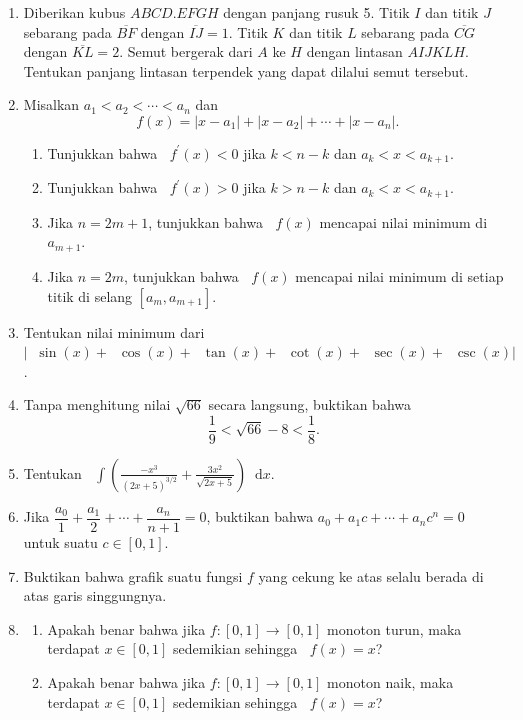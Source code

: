 \documentclass[12pt]{article}
\newcommand*\diff{\mathop{}\!\mathrm{d}}
\newcommand*\func[2]{\mathop{}\!{#1}{\left({#2}\right)}}
\newcommand*\ds[1]{\mathop{}\!\displaystyle{{#1}}}
\begin{document}
\begin{enumerate}[leftmargin=*]
		\item Diberikan kubus $ ABCD.EFGH $ dengan panjang rusuk 5. Titik $ I $ dan titik $ J $ sebarang pada $ \overline{BF} $ dengan $ \overline{IJ} = 1 $. Titik $ K $ dan titik $ L $ sebarang pada $ \overline{CG} $ dengan $ \overline{KL} = 2 $. Semut bergerak dari $ A $ ke $ H $ dengan lintasan $ AIJKLH $. Tentukan panjang lintasan terpendek yang dapat dilalui semut tersebut.
		\item Misalkan $ a_{1} < a_{2} < \cdots < a_{n} $ dan
		\[ \func{f}{x} = \left|x - a_{1}\right| + \left|x - a_{2}\right| + \cdots + \left|x - a_{n}\right|. \]
		\begin{enumerate}
			\item Tunjukkan bahwa $ \func{f^{\prime}}{x} < 0 $ jika $ k < n - k $ dan $ a_{k} < x < a_{k + 1} $.
			\item Tunjukkan bahwa $ \func{f^{\prime}}{x} > 0 $ jika $ k > n - k $ dan $ a_{k} < x < a_{k + 1} $.
			\item Jika $ n = 2m + 1 $, tunjukkan bahwa $ \func{f}{x} $ mencapai nilai minimum di $ a_{m + 1} $.
			\item Jika $ n = 2m $, tunjukkan bahwa $ \func{f}{x} $ mencapai nilai minimum di setiap titik di selang $ \left[a_{m}, a_{m + 1}\right] $.
		\end{enumerate}
		\item Tentukan nilai minimum dari $ \left|\func{\sin}{x} + \func{\cos}{x} + \func{\tan}{x} + \func{\cot}{x} + \func{\sec}{x} + \func{\csc}{x}\right| $.
		\item Tanpa menghitung nilai $ \sqrt{66} $ secara langsung, buktikan bahwa
		\[ \frac{1}{9} < \sqrt{66} - 8 < \frac{1}{8}. \]
		\item Tentukan $ \ds{\int{\left(\frac{-x^{3}}{\left(2x + 5\right)^{3/2}} + \frac{3x^{2}}{\sqrt{2x + 5}}\right) \diff{x}}} $.
		\item Jika $ \dfrac{a_{0}}{1} + \dfrac{a_{1}}{2} + \cdots + \dfrac{a_{n}}{n + 1} = 0 $, buktikan bahwa $ a_{0} + a_{1}c + \cdots + a_{n}c^{n} = 0 $ untuk suatu $ c \in \left[0, 1\right] $.
		\item Buktikan bahwa grafik suatu fungsi $ f $ yang cekung ke atas selalu berada di atas garis singgungnya.
		\item
		\begin{enumerate}
			\item Apakah benar bahwa jika $ f : \left[0, 1\right] \to \left[0, 1\right] $ monoton turun, maka terdapat $ x \in \left[0, 1\right] $ sedemikian sehingga $ \func{f}{x} = x $?
			\item Apakah benar bahwa jika $ f : \left[0, 1\right] \to \left[0, 1\right] $ monoton naik, maka terdapat $ x \in \left[0, 1\right] $ sedemikian sehingga $ \func{f}{x} = x $?

\end{enumerate}
\end{enumerate}
\end{document}
